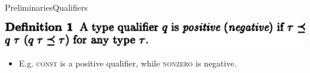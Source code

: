 \documentclass{beamer}
\let\todox\todo
\renewcommand\todo[1]{\todox[inline]{#1}}
\begin{document}


\begin{frame}{Preliminaries}{Qualifiers}
  \begin{center}\includegraphics[scale=0.25]{paper_qualifier_def.png}\end{center}
  \begin{itemize}
  \item E.g. \textsc{const} is a positive qualifier, while
    \textsc{nonzero} is negative.
  \end{itemize}

  \bigskip

\end{frame}
\end{document}
